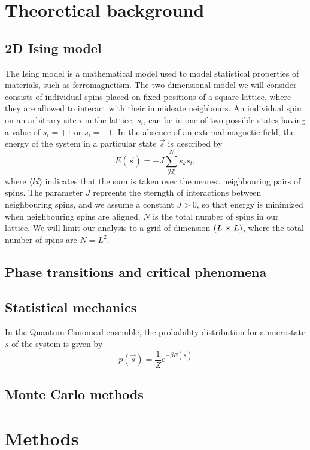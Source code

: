 \section{Theoretical background}\label{sec:theory}
\subsection{2D Ising model}\label{subsec_theory:ising_2d}
The Ising model is a mathematical model used to model statistical properties of materials, such as ferromagnetism. The two dimensional model we will consider consists of individual spins  placed on fixed positions of a square lattice, where they are allowed to interact with their immideate neighbours. An individual spin on an arbitrary site $i$ in the lattice, $s_i$, can be in one of two possible states having a value of $s_i=+1$ or $s_i=-1$. In the absence of an external magnetic field, the energy of the system in a particular state $\vec{s}$ is described by  
\begin{equation} \label{eq:energy}
    E(\vec{s}) = -J \sum_{\langle kl \rangle}^N s_k s_l,
\end{equation}
where $\langle kl\rangle$ indicates that the sum is taken over the nearest neighbouring pairs of spins.  The parameter $J$ repreents the sterngth of interactions between neighbouring spins, and we assume a constant $J>0$, so that energy is minimized when neighbouring spins are aligned. $N$ is the total number of spins in our lattice. We will limit our analysis to a grid of dimension $(L\cross L)$, where the total number of spins are $N=L^2$.  

\subsection{Phase transitions and critical phenomena}\label{subsec_theory:PT_critical_phenomena}


\subsection{Statistical mechanics}\label{subsec_theory:statistical_mechanics}
In the Quantum Canonical ensemble, the probability distribution for a microstate $s$ of the system is given by 
\begin{equation}\label{eq:boltzmann_distr}
    p(\vec{s}) = \frac{1}{Z}e^{-\beta E(\vec{s})} 
\end{equation} 


\subsection{Monte Carlo methods} \label{subsec_theory:MC_methods}


\section{Methods}\label{sec:methods}

